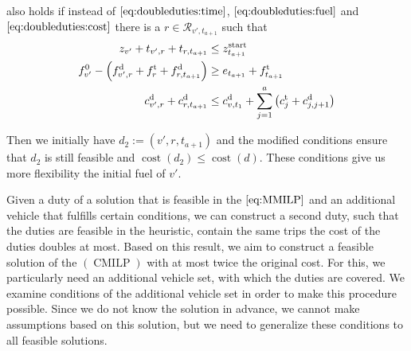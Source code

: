 \begin{remark}
\label{rem:doubleduties}

 also holds if instead of $\eqref{eq:doubleduties:time}$, $\eqref{eq:doubleduties:fuel}$ and $\eqref{eq:doubleduties:cost}$ there is a ${r\in\mathcal{R}_{v',t_{a+1}}}$ such that
\begin{align}
	z_{v'} + t_{v',r} + t_{r,t_{a+1}} & \leq z^{\operatorname{start}}_{t_{a+1}} \label{eq:doubleduties:time_r} \\
	f^0_{v'} - \left(f^{\operatorname{d}}_{v',r}+f^{\operatorname{t}}_r+f^{\operatorname{d}}_{r,t_{a+1}}\right) & \geq e_{t_{a+1}} + f^{\operatorname{t}}_{t_{a+1}} \label{eq:doubleduties:fuel_r} \\
	c^{\operatorname{d}}_{v',r}+c^{\operatorname{d}}_{r,t_{a+1}} & \leq c^{\operatorname{d}}_{v,t_1} + \sum_{j=1}^a \left(c^{\operatorname{t}}_j + c^{\operatorname{d}}_{j,j+1}\right) \label{eq:doubleduties:cost_r}
\end{align}

Then we initially have $d_2:=\left(v',r,t_{a+1}\right)$ and the modified conditions ensure that $d_2$ is still feasible and ${\operatorname{cost}\left(d_2\right)\leq\operatorname{cost}\left(d\right)}$. These conditions give us more flexibility \wrt the initial fuel of $v'$.

\end{remark}

Given a duty of a solution that is feasible in the $\eqref{eq:MMILP}$ and an additional vehicle that fulfills certain conditions, we can construct a second duty, such that the duties are feasible in the heuristic, contain the same trips the cost of the duties doubles at most. Based on this result, we aim to construct a feasible solution of the $(\operatorname{CMILP})$ with at most twice the original cost. For this, we particularly need an additional vehicle set, with which the duties are covered. We examine conditions of the additional vehicle set in order to make this procedure possible. Since we do not know the solution in advance, we cannot make assumptions based on this solution, but we need to generalize these conditions to all feasible solutions.

